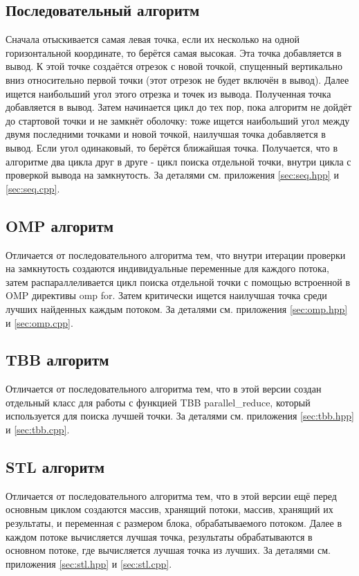 \documentclass[12pt,a4paper]{extarticle}
\begin{document}
\subsection{Последовательный алгоритм}
Сначала отыскивается самая левая точка, если их несколько на одной горизонтальной координате, то берётся самая высокая. Эта точка добавляется в вывод. К этой точке создаётся отрезок с новой точкой, спущенный вертикально вниз относительно первой точки (этот отрезок не будет включён в вывод). Далее ищется наибольший угол этого отрезка и точек из вывода. Полученная точка добавляется в вывод. Затем начинается цикл до тех пор, пока алгоритм не дойдёт до стартовой точки и не замкнёт оболочку: тоже ищется наибольший угол между двумя последними точками и новой точкой, наилучшая точка добавляется в вывод. Если угол одинаковый, то берётся ближайшая точка.
Получается, что в алгоритме два цикла друг в друге - цикл поиска отдельной точки, внутри цикла с проверкой вывода на замкнутость. За деталями см. приложения \ref{sec:seq.hpp} и \ref{sec:seq.cpp}.

\subsection{OMP алгоритм}
Отличается от последовательного алгоритма тем, что внутри итерации проверки на замкнутость создаются индивидуальные переменные для каждого потока, затем распараллеливается цикл поиска отдельной точки с помощью встроенной в OMP директивы omp for. Затем критически ищется наилучшая точка среди лучших найденных каждым потоком. За деталями см. приложения \ref{sec:omp.hpp} и \ref{sec:omp.cpp}.

\subsection{TBB алгоритм}
Отличается от последовательного алгоритма тем, что в этой версии создан отдельный класс для работы с функцией TBB parallel\_reduce, который используется для поиска лучшей точки. За деталями см. приложения \ref{sec:tbb.hpp} и \ref{sec:tbb.cpp}.

\subsection{STL алгоритм}
Отличается от последовательного алгоритма тем, что в этой версии ещё перед основным циклом создаются массив, хранящий потоки, массив, хранящий их результаты, и переменная с размером блока, обрабатываемого потоком.
Далее в каждом потоке вычисляется лучшая точка, результаты обрабатываются в основном потоке, где вычисляется лучшая точка из лучших.
За деталями см. приложения \ref{sec:stl.hpp} и \ref{sec:stl.cpp}.
\end{document}
